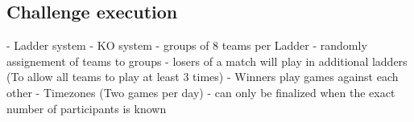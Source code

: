 \subsection{Challenge execution}
- Ladder system
    - KO system 
    - groups of 8 teams per Ladder
    - randomly assignement of teams to groups
    - losers of a match will play in additional ladders (To allow all teams to play at least 3 times)
    - Winners play games against each other
    - Timezones (Two games per day)
    - can only be finalized when the exact number of participants is known